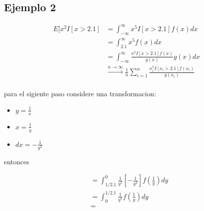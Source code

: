 \documentclass[10pt, oneside]{article}
\begin{document}
\subsection{Ejemplo 2}

\[
	\begin{split}
		E[x^2I[x > 2.1] & = \int_{-\infty}^{\infty} x^5 I[x > 2.1] f(x) dx                                               \\
		                & = \int_{2.1}^{\infty} x^5 f(x) dx                                                              \\
		                & = \int_{-\infty}^{\infty} \frac{x^5 I[x > 2.1] f(x)}{g(x)} g(x) dx                             \\
		                & \xrightarrow{n \to \infty} \frac{1}{n} \sum_{i=1}^{n} \frac{x_i^5 I[x_i > 2.1] f(x_i)}{g(x_i)} \\
	\end{split}
\]

para el sigiente paso considere una transformacion:

\begin{itemize}
	\item $y= \frac{1}{x}$
	\item $x= \frac{1}{y}$
	\item $dx = -\frac{1}{y^2}$
\end{itemize}

entonces

\[
	\begin{split}
		 & = \int_{1/2.1}^{0} \frac{1}{y^5} [-\frac{1}{y^2}] f(\frac{1}{y}) dy \\
		 & = \int_{0}^{1/2.1} \frac{1}{y^7} f(\frac{1}{y}) dy                  \\
		 & =
	\end{split}
\]
\end{document}
